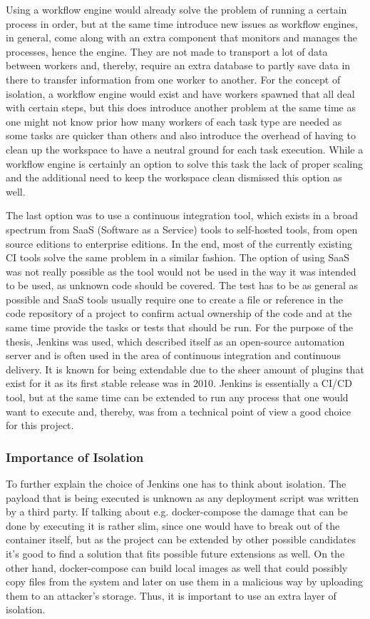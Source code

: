 Using a workflow engine would already solve the problem of running a certain process in order, but at the same time introduce new issues as workflow engines, in general, come along with an extra component that monitors and manages the processes, hence the engine. They are not made to transport a lot of data between workers and, thereby, require an extra database to partly save data in there to transfer information from one worker to another. For the concept of isolation, a workflow engine would exist and have workers spawned that all deal with certain steps, but this does introduce another problem at the same time as one might not know prior how many workers of each task type are needed as some tasks are quicker than others and also introduce the overhead of having to clean up the workspace to have a neutral ground for each task execution. While a workflow engine is certainly an option to solve this task the lack of proper scaling and the additional need to keep the workspace clean dismissed this option as well.

The last option was to use a continuous integration tool, which exists in a broad spectrum from SaaS (Software as a Service) tools to self-hosted tools, from open source editions to enterprise editions. In the end, most of the currently existing CI tools solve the same problem in a similar fashion. The option of using SaaS was not really possible as the tool would not be used in the way it was intended to be used, as unknown code should be covered. The test has to be as general as possible and SaaS tools usually require one to create a file or reference in the code repository of a project to confirm actual ownership of the code and at the same time provide the tasks or tests that should be run.
For the purpose of the thesis, Jenkins was used, which described itself as an open-source automation server \cite{jenkins} and is often used in the area of continuous integration and continuous delivery. It is known for being extendable due to the sheer amount of plugins that exist for it as its first stable release was in 2010. Jenkins is essentially a CI/CD tool, but at the same time can be extended to run any process that one would want to execute and, thereby, was from a technical point of view a good choice for this project.

\subsubsection{Importance of Isolation}
\label{sec:importance_of_isolation}
To further explain the choice of Jenkins one has to think about isolation. The payload that is being executed is unknown as any deployment script was written by a third party. If talking about e.g. docker-compose the damage that can be done by executing it is rather slim, since one would have to break out of the container itself, but as the project can be extended by other possible candidates it's good to find a solution that fits possible future extensions as well. On the other hand, docker-compose can build local images as well that could possibly copy files from the system and later on use them in a malicious way by uploading them to an attacker's storage. Thus, it is important to use an extra layer of isolation.

